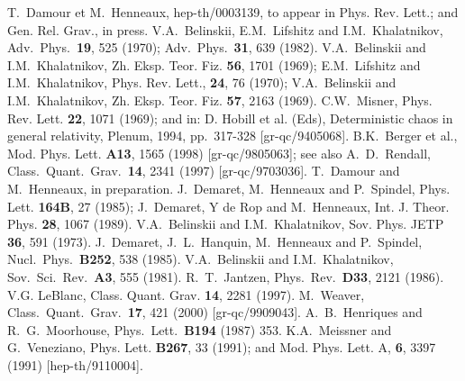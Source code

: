 \documentclass[a4paper,12pt]{article}
\begin{document}
\begin{thebibliography}{99}
 T.~Damour et M.~Henneaux, hep-th/0003139, 
to appear in Phys. Rev. Lett.; 
and Gen. Rel. Grav., in press.
 V.A.~Belinskii, E.M.~Lifshitz and I.M.~Khalatnikov, Adv.\ 
Phys.\  {\bf 19}, 525 (1970); 
Adv.\ Phys.\  {\bf 31}, 639 (1982).
 V.A.~Belinskii and I.M.~Khalatnikov, Zh. Eksp. Teor. Fiz. 
{\bf 56}, 1701 (1969); E.M.~Lifshitz and I.M.~Khalatnikov, Phys. Rev. 
Lett., {\bf 24}, 76 (1970); V.A.~Belinskii and I.M.~Khalatnikov, Zh. Eksp. 
Teor. Fiz. {\bf 57}, 2163 (1969).
 C.W.~Misner, Phys. Rev. Lett. {\bf 22}, 1071 (1969);
and in: D. Hobill et al. (Eds), Deterministic chaos in general relativity,
 Plenum, 1994, pp.~317-328 [gr-qc/9405068]. 
 B.K.~Berger et al., Mod. Phys. Lett. {\bf A13}, 1565 
(1998) [gr-qc/9805063];
see also A.~D.~Rendall,
Class.\ Quant.\ Grav.\  {\bf 14}, 2341 (1997)
[gr-qc/9703036].
 T.~Damour and M.~Henneaux, in preparation.
 J.~Demaret, M.~Henneaux and P.~Spindel, Phys. Lett. 
{\bf 164B}, 27 (1985); 
J.~Demaret, Y de Rop and M.~Henneaux, Int. J. 
Theor. Phys. {\bf 28}, 1067 (1989).
 V.A.~Belinskii and I.M.~Khalatnikov, Sov. Phys. JETP {\bf 
36}, 591 (1973).
 J.~Demaret, J.~L.~Hanquin, M.~Henneaux and P.~Spindel,
Nucl.\ Phys.\  {\bf B252}, 538 (1985).
 V.A.~Belinskii and I.M.~Khalatnikov, Sov.\ Sci.\ Rev.\
{\bf A3}, 555 (1981).
 R.~T.~Jantzen,
Phys.\ Rev.\  {\bf D33}, 2121 (1986).
\bibitem{Leblanc} V.G. LeBlanc, Class. Quant. Grav. {\bf 14}, 2281 (1997).
\bibitem{Weaver}M.~Weaver,
Class.\ Quant.\ Grav.\  {\bf 17}, 421 (2000)
[gr-qc/9909043].
 A.~B.~Henriques and R.~G.~Moorhouse,
Phys.\ Lett.\  {\bf B194} (1987) 353.
\bibitem{MV} K.A.~Meissner and G.~Veneziano, Phys. Lett. {\bf B267}, 33 
(1991); 
and Mod. Phys. Lett. A, {\bf 6}, 3397 (1991) [hep-th/9110004].
\end{thebibliography}
\end{document}
